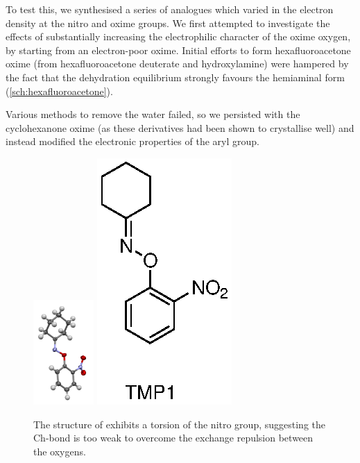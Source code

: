 \begin{refsection}
To test this, we synthesised a series of analogues which varied in the electron density at the nitro and oxime groups.
We first attempted to investigate the effects of substantially increasing the electrophilic character of the oxime oxygen, by starting from an electron-poor oxime.
Initial efforts to form hexafluoroacetone oxime (from hexafluoroacetone deuterate and hydroxylamine) were hampered by the fact that the dehydration equilibrium strongly favours the hemiaminal form (\cref{sch:hexafluoroacetone}).

Various methods to remove the water failed, so we persisted with the cyclohexanone oxime (as these derivatives had been shown to crystallise well) and instead modified the electronic properties of the aryl group.

\begin{figure}
    \centering
    \includegraphics[height=4cm]{Figures/cyclohexanone-oxime-2np.pdf}
    \includegraphics[scale=0.74]{Figures/cyclohexanone-oxime-2np.eps}
    \caption[Structure of .]{The structure of  exhibits a torsion of the nitro group, suggesting the Ch-bond is too weak to overcome the exchange repulsion between the oxygens.}\label{fig:cyclohexanone-oxime-2np}
\end{figure}    


\end{refsection}
